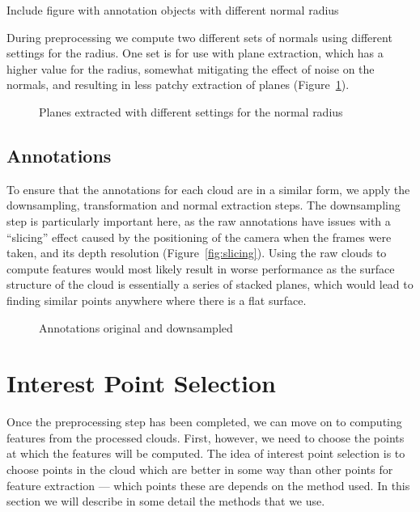 \documentclass[11pt,a4paper]{kth-mag}
\begin{document}
Include figure with annotation objects with different normal radius

During preprocessing we compute two different sets of normals using different
settings for the radius. One set is for use with plane extraction, which has a
higher value for the radius, somewhat mitigating the effect of noise on the
normals, and resulting in less patchy extraction of planes
(Figure~\ref{fig:plane_normrad}).

\begin{figure}
  \centering
  
  \caption{Planes extracted with different settings for the normal radius}
  \label{fig:plane_normrad}
\end{figure}

\subsection{Annotations}
To ensure that the annotations for each cloud are in a similar form, we apply
the downsampling, transformation and normal extraction steps. The downsampling
step is particularly important here, as the raw annotations have issues with a
``slicing'' effect caused by the positioning of the camera when the frames were
taken, and its depth resolution (Figure~\ref{fig:slicing}). Using the raw clouds
to compute features would most likely result in worse performance as the surface
structure of the cloud is essentially a series of stacked planes, which would
lead to finding similar points anywhere where there is a flat surface.

\begin{figure}
  \centering
  \caption{Annotations original and downsampled}
  \label{fig:annotation_ds}
\end{figure}
\section{Interest Point Selection}
Once the preprocessing step has been completed, we can move on to computing
features from the processed clouds. First, however, we need to choose the points
at which the features will be computed. The idea of interest point selection is
to choose points in the cloud which are better in some way than other points for
feature extraction --- which points these are depends on the method used. In this
section we will describe in some detail the methods that we use.
\end{document}
